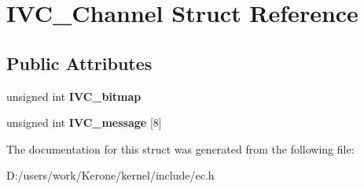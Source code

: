 \section{I\+V\+C\+\_\+\+Channel Struct Reference}
\label{struct_i_v_c___channel}
\subsection*{Public Attributes}
\begin{DoxyCompactItemize}
\item 
\mbox{\label{struct_i_v_c___channel_a8ccddf197b7a91ab4716f470d4019f5e}} 
unsigned int {\bfseries I\+V\+C\+\_\+bitmap}
\item 
\mbox{\label{struct_i_v_c___channel_ae19e6beb7f18839b42d7565fbf847923}} 
unsigned int {\bfseries I\+V\+C\+\_\+message} [8]
\end{DoxyCompactItemize}


The documentation for this struct was generated from the following file\+:\begin{DoxyCompactItemize}
\item 
D\+:/users/work/\+Kerone/kernel/include/ec.\+h\end{DoxyCompactItemize}
